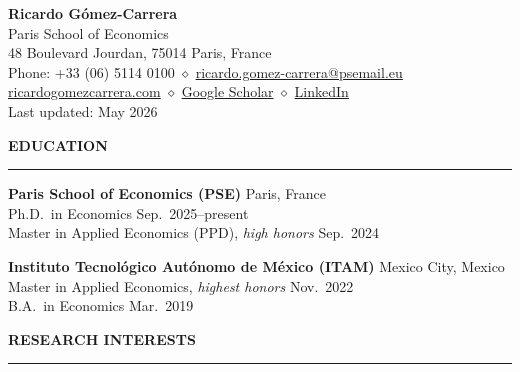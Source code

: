 \documentclass[11pt,letterpaper]{article}
\renewcommand{\section}[1]{%
  \vspace{0.8em}%
  {\large\bfseries\MakeUppercase{#1}}%
  \vspace{0.3em}%
  \hrule%
  \vspace{0.4em}%
}
\begin{document}
\thispagestyle{firstpage}


\begin{center}
{\LARGE \textbf{Ricardo G\'{o}mez-Carrera}} \\[0.5em]
Paris School of Economics \\
48 Boulevard Jourdan, 75014 Paris, France \\[0.3em]
Phone: +33 (06) 5114 0100 \quad $\diamond$ \quad
\href{mailto:ricardo.gomez-carrera@psemail.eu}{ricardo.gomez-carrera@psemail.eu} \\
\href{https://ricardogomezcarrera.com/}{ricardogomezcarrera.com} \quad $\diamond$ \quad
\href{https://scholar.google.com/citations?user=X\_RXBoEAAAAJ}{Google Scholar} \quad $\diamond$ \quad
\href{https://www.linkedin.com/in/ricardo-g\%C3\%B3mez-carrera-60849412a/}{LinkedIn} \\[0.3em]
{\small Last updated: May 2026}
\end{center}

\vspace{0.3em}


\section{Education}

\textbf{Paris School of Economics (PSE)} \hfill Paris, France \\
Ph.D.\ in Economics \hfill Sep.\ 2025--present \\
Master in Applied Economics (PPD), \textit{high honors} \hfill Sep.\ 2024

\textbf{Instituto Tecnol\'{o}gico Aut\'{o}nomo de M\'{e}xico (ITAM)} \hfill Mexico City, Mexico \\
Master in Applied Economics, \textit{highest honors} \hfill Nov.\ 2022 \\
B.A.\ in Economics \hfill Mar.\ 2019


\section{Research Interests}
\end{document}
